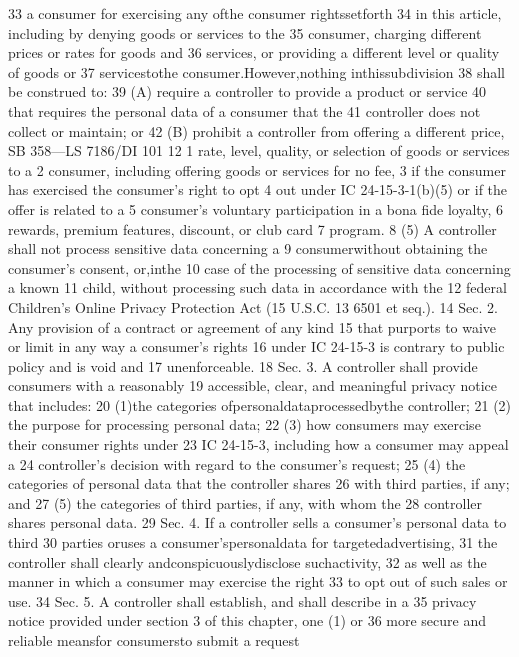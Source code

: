 33 a consumer for exercising any ofthe consumer rightssetforth
34 in this article, including by denying goods or services to the
35 consumer, charging different prices or rates for goods and
36 services, or providing a different level or quality of goods or
37 servicestothe consumer.However,nothing inthissubdivision
38 shall be construed to:
39 (A) require a controller to provide a product or service
40 that requires the personal data of a consumer that the
41 controller does not collect or maintain; or
42 (B) prohibit a controller from offering a different price,
SB 358—LS 7186/DI 101
12
1 rate, level, quality, or selection of goods or services to a
2 consumer, including offering goods or services for no fee,
3 if the consumer has exercised the consumer's right to opt
4 out under IC 24-15-3-1(b)(5) or if the offer is related to a
5 consumer's voluntary participation in a bona fide loyalty,
6 rewards, premium features, discount, or club card
7 program.
8 (5) A controller shall not process sensitive data concerning a
9 consumerwithout obtaining the consumer's consent, or,inthe
10 case of the processing of sensitive data concerning a known
11 child, without processing such data in accordance with the
12 federal Children's Online Privacy Protection Act (15 U.S.C.
13 6501 et seq.).
14 Sec. 2. Any provision of a contract or agreement of any kind
15 that purports to waive or limit in any way a consumer's rights
16 under IC 24-15-3 is contrary to public policy and is void and
17 unenforceable.
18 Sec. 3. A controller shall provide consumers with a reasonably
19 accessible, clear, and meaningful privacy notice that includes:
20 (1)the categories ofpersonaldataprocessedbythe controller;
21 (2) the purpose for processing personal data;
22 (3) how consumers may exercise their consumer rights under
23 IC 24-15-3, including how a consumer may appeal a
24 controller's decision with regard to the consumer's request;
25 (4) the categories of personal data that the controller shares
26 with third parties, if any; and
27 (5) the categories of third parties, if any, with whom the
28 controller shares personal data.
29 Sec. 4. If a controller sells a consumer's personal data to third
30 parties oruses a consumer'spersonaldata for targetedadvertising,
31 the controller shall clearly andconspicuouslydisclose suchactivity,
32 as well as the manner in which a consumer may exercise the right
33 to opt out of such sales or use.
34 Sec. 5. A controller shall establish, and shall describe in a
35 privacy notice provided under section 3 of this chapter, one (1) or
36 more secure and reliable meansfor consumersto submit a request
